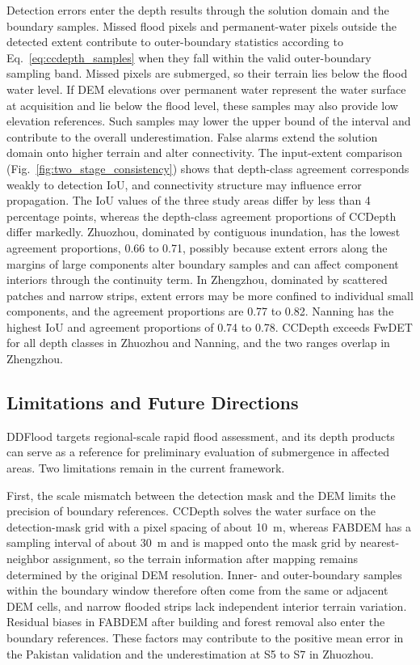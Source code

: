 \documentclass[authoryear,preprint,12pt]{elsarticle}
\begin{document}
Detection errors enter the depth results through the solution domain and the boundary samples. Missed flood pixels and permanent-water pixels outside the detected extent contribute to outer-boundary statistics according to Eq.~\eqref{eq:ccdepth_samples} when they fall within the valid outer-boundary sampling band. Missed pixels are submerged, so their terrain lies below the flood water level. If DEM elevations over permanent water represent the water surface at acquisition and lie below the flood level, these samples may also provide low elevation references. Such samples may lower the upper bound of the interval and contribute to the overall underestimation. False alarms extend the solution domain onto higher terrain and alter connectivity. The input-extent comparison (Fig.~\ref{fig:two_stage_consistency}) shows that depth-class agreement corresponds weakly to detection IoU, and connectivity structure may influence error propagation. The IoU values of the three study areas differ by less than 4 percentage points, whereas the depth-class agreement proportions of CCDepth differ markedly. Zhuozhou, dominated by contiguous inundation, has the lowest agreement proportions, 0.66 to 0.71, possibly because extent errors along the margins of large components alter boundary samples and can affect component interiors through the continuity term. In Zhengzhou, dominated by scattered patches and narrow strips, extent errors may be more confined to individual small components, and the agreement proportions are 0.77 to 0.82. Nanning has the highest IoU and agreement proportions of 0.74 to 0.78. CCDepth exceeds FwDET for all depth classes in Zhuozhou and Nanning, and the two ranges overlap in Zhengzhou.

\subsection{Limitations and Future Directions}

DDFlood targets regional-scale rapid flood assessment, and its depth products can serve as a reference for preliminary evaluation of submergence in affected areas. Two limitations remain in the current framework.

First, the scale mismatch between the detection mask and the DEM limits the precision of boundary references. CCDepth solves the water surface on the detection-mask grid with a pixel spacing of about 10~m, whereas FABDEM has a sampling interval of about 30~m and is mapped onto the mask grid by nearest-neighbor assignment, so the terrain information after mapping remains determined by the original DEM resolution. Inner- and outer-boundary samples within the boundary window therefore often come from the same or adjacent DEM cells, and narrow flooded strips lack independent interior terrain variation. Residual biases in FABDEM after building and forest removal also enter the boundary references. These factors may contribute to the positive mean error in the Pakistan validation and the underestimation at S5 to S7 in Zhuozhou.
\end{document}
